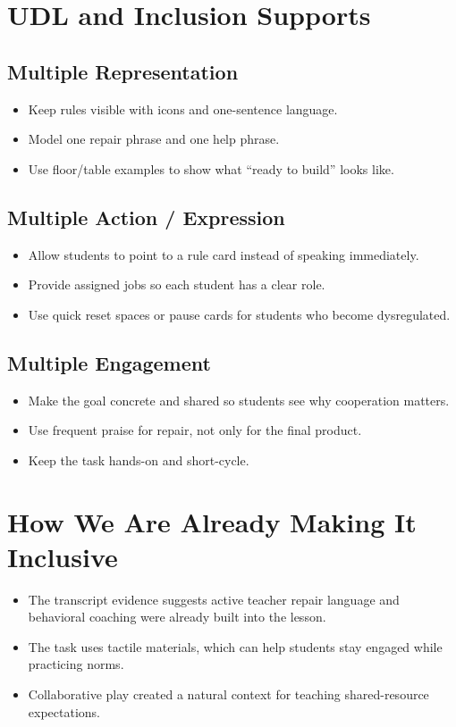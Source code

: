 \documentclass[11pt]{article}
\begin{document}
\section*{UDL and Inclusion Supports}
\subsection*{Multiple Representation}
\begin{itemize}[leftmargin=*]
\item Keep rules visible with icons and one-sentence language.
\item Model one repair phrase and one help phrase.
\item Use floor/table examples to show what “ready to build” looks like.
\end{itemize}

\subsection*{Multiple Action / Expression}
\begin{itemize}[leftmargin=*]
\item Allow students to point to a rule card instead of speaking immediately.
\item Provide assigned jobs so each student has a clear role.
\item Use quick reset spaces or pause cards for students who become dysregulated.
\end{itemize}

\subsection*{Multiple Engagement}
\begin{itemize}[leftmargin=*]
\item Make the goal concrete and shared so students see why cooperation matters.
\item Use frequent praise for repair, not only for the final product.
\item Keep the task hands-on and short-cycle.
\end{itemize}

\section*{How We Are Already Making It Inclusive}
\begin{itemize}[leftmargin=*]
\item The transcript evidence suggests active teacher repair language and behavioral coaching were already built into the lesson.
\item The task uses tactile materials, which can help students stay engaged while practicing norms.
\item Collaborative play created a natural context for teaching shared-resource expectations.
\end{itemize}
\end{document}
